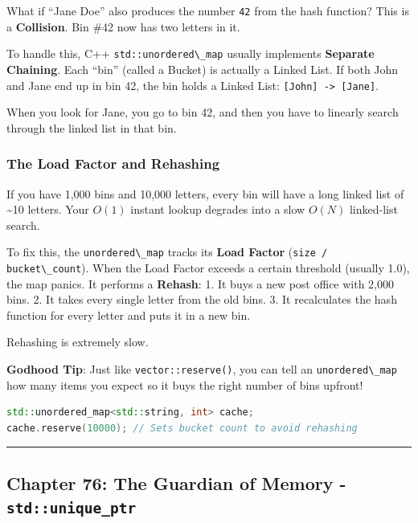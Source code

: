 What if ``Jane Doe'' also produces the number
\passthrough{\lstinline!42!} from the hash function? This is a
\textbf{Collision}. Bin \#42 now has two letters in it.

To handle this, C++ \passthrough{\lstinline!std::unordered\_map!}
usually implements \textbf{Separate Chaining}. Each ``bin'' (called a
Bucket) is actually a Linked List. If both John and Jane end up in bin
42, the bin holds a Linked List:
\passthrough{\lstinline![John] -> [Jane]!}.

When you look for Jane, you go to bin 42, and then you have to linearly
search through the linked list in that bin.

\hypertarget{the-load-factor-and-rehashing}{%
\subsubsection{The Load Factor and
Rehashing}\label{the-load-factor-and-rehashing}}

If you have 1,000 bins and 10,000 letters, every bin will have a long
linked list of \textasciitilde10 letters. Your \(O(1)\) instant lookup
degrades into a slow \(O(N)\) linked-list search.

To fix this, the \passthrough{\lstinline!unordered\_map!} tracks its
\textbf{Load Factor} (\passthrough{\lstinline!size / bucket\_count!}).
When the Load Factor exceeds a certain threshold (usually 1.0), the map
panics. It performs a \textbf{Rehash}: 1. It buys a new post office with
2,000 bins. 2. It takes every single letter from the old bins. 3. It
recalculates the hash function for every letter and puts it in a new
bin.

Rehashing is extremely slow.

\textbf{Godhood Tip}: Just like
\passthrough{\lstinline!vector::reserve()!}, you can tell an
\passthrough{\lstinline!unordered\_map!} how many items you expect so it
buys the right number of bins upfront!

\begin{lstlisting}[language={C++}]
std::unordered_map<std::string, int> cache;
cache.reserve(10000); // Sets bucket count to avoid rehashing
\end{lstlisting}

\begin{center}\rule{0.5\linewidth}{0.5pt}\end{center}

\hypertarget{chapter-76-the-guardian-of-memory---stdunique_ptr}{%
\subsection{\texorpdfstring{Chapter 76: The Guardian of Memory -
\texttt{std::unique\_ptr}}{Chapter 76: The Guardian of Memory - std::unique\_ptr}}\label{chapter-76-the-guardian-of-memory---stdunique_ptr}}

